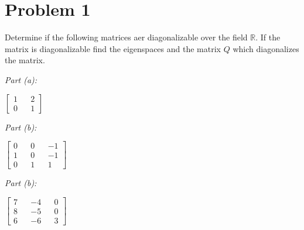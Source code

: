 \documentclass[10pt,a4paper]{article}
\author{Jeremiah Givens}
\makeatletter
\newcommand{\proofpart}[2]{%
  \par
  \addvspace{\medskipamount}%
  \noindent\emph{Part #1: #2}\par\nobreak
  \addvspace{\smallskipamount}%
  \@afterheading
}
\theoremstyle{definition}
\makeatother
\begin{document}
\section*{Problem 1}
Determine if the following matrices aer diagonalizable over the field $\mathbb{R}$. If the matrix is diagonalizable find the eigenspaces and the matrix $Q$ which diagonalizes the matrix.
\proofpart{(a)}{}
$
\begin{bmatrix}
1 && 2\\
0 && 1
\end{bmatrix}
$
\proofpart{(b)}{}
$
\begin{bmatrix}
0 && 0 && -1\\
1 && 0 && -1\\
0 && 1 && 1
\end{bmatrix}
$
\proofpart{(b)}{}
$
\begin{bmatrix}
7 && -4 && 0\\
8 && -5 && 0\\
6 && -6 && 3
\end{bmatrix}
$
\end{document}
